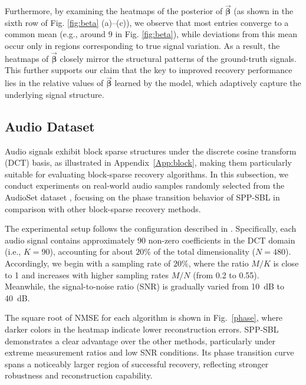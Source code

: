 \documentclass[lettersize,journal]{IEEEtran}
\theoremstyle{remark}
\begin{document}
Furthermore, by examining the heatmaps of the posterior of $\vec{\boldsymbol{\beta}}$ (as shown in the sixth row of Fig. \ref{fig:beta} (a)–(c)), we observe that most entries converge to a common mean (e.g., around $9$ in Fig. \ref{fig:beta}), while deviations from this mean occur only in regions corresponding to true signal variation. As a result, the heatmaps of $\vec{\boldsymbol{\beta}}$ closely mirror the structural patterns of the ground-truth signals. This further supports our claim that the key to improved recovery performance lies in the relative values of $\vec{\boldsymbol{\beta}}$ learned by the model, which adaptively capture the underlying signal structure.











\subsection{Audio Dataset}\label{audioset}



Audio signals exhibit block sparse structures under the discrete cosine transform (DCT) basis, as illustrated in Appendix~\ref{App:block}, making them particularly suitable for evaluating block-sparse recovery algorithms. In this subsection, we conduct experiments on real-world audio samples randomly selected from the AudioSet dataset \cite{gemmeke2017audio}, focusing on the phase transition behavior of SPP-SBL in comparison with other block-sparse recovery methods.


The experimental setup follows the configuration described in \cite{NEURIPS2024_ead542f1}. Specifically, each audio signal contains approximately 90 non-zero coefficients in the DCT domain (i.e., $K = 90$), accounting for about $20\%$ of the total dimensionality ($N = 480$). Accordingly, we begin with a sampling rate of $20\%$, where the ratio $M/K$ is close to 1 and increases with higher sampling rates $M/N$ (from 0.2 to 0.55). Meanwhile, the signal-to-noise ratio (SNR) is gradually varied from 10~dB to 40~dB.

The square root of NMSE for each algorithm is shown in Fig.~\ref{phase}, where darker colors in the heatmap indicate lower reconstruction errors. SPP-SBL demonstrates a clear advantage over the other methods, particularly under extreme measurement ratios and low SNR conditions. Its phase transition curve spans a noticeably larger region of successful recovery, reflecting stronger robustness and reconstruction capability. 
\end{document}
